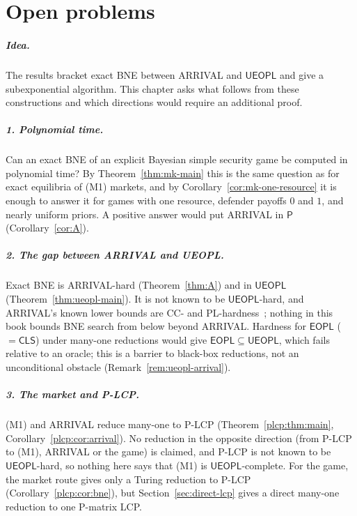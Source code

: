 \chapter{Open problems}\label{ch:open}

\paragraph{Idea.} The results bracket exact BNE between ARRIVAL and $\mathsf{UEOPL}$ and give a
subexponential algorithm. This chapter asks what follows from these
constructions and which directions would require an additional proof.

\paragraph{1. Polynomial time.} Can an exact BNE of an explicit Bayesian simple security game be computed
in polynomial time? By Theorem~\ref{thm:mk-main} this is the same question as for exact equilibria of
(M1) markets, and by Corollary~\ref{cor:mk-one-resource} it is enough to answer it for games with one
resource, defender payoffs $0$ and $1$, and nearly uniform priors. A positive answer would put ARRIVAL in
$\mathsf P$ (Corollary~\ref{cor:A}).

\paragraph{2. The gap between ARRIVAL and UEOPL.} Exact BNE is ARRIVAL-hard (Theorem~\ref{thm:A}) and in
$\mathsf{UEOPL}$ (Theorem~\ref{thm:ueopl-main}). It is not known to be $\mathsf{UEOPL}$-hard, and ARRIVAL's known lower bounds are CC- and PL-hardness~\cite{manuell21}; nothing in this book bounds BNE search from below beyond ARRIVAL. Hardness for $\mathsf{EOPL}$ ($=\mathsf{CLS}$) under many-one reductions would give $\mathsf{EOPL}\subseteq\mathsf{UEOPL}$, which fails relative to an oracle; this is a barrier to black-box reductions, not an unconditional obstacle
(Remark~\ref{rem:ueopl-arrival}).

\paragraph{3. The market and P-LCP.} (M1) and ARRIVAL reduce many-one to P-LCP
(Theorem~\ref{plcp:thm:main}, Corollary~\ref{plcp:cor:arrival}). No reduction in the opposite direction
(from P-LCP to (M1), ARRIVAL or the game) is claimed, and P-LCP is not known to be $\mathsf{UEOPL}$-hard,
so nothing here says that (M1) is $\mathsf{UEOPL}$-complete. For the game, the market route gives only a Turing reduction to P-LCP (Corollary~\ref{plcp:cor:bne}),
but Section~\ref{sec:direct-lcp} gives a direct many-one reduction to one P-matrix LCP.

